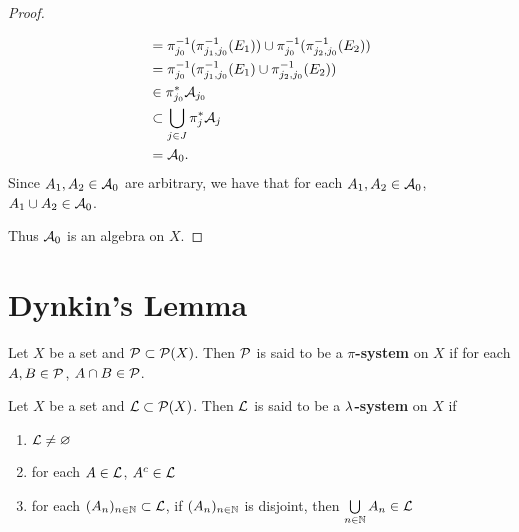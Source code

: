 \documentclass{book}
\begin{document}
\begin{proof}
\begin{enumerate}
\begin{align*}
			& = \pi_{j_0}^{-1}(\pi_{j_1, j_0}^{-1}(E_1)) \cup \pi_{j_0}^{-1}(\pi_{j_2, j_0}^{-1}(E_2)) \\
			& = \pi_{j_0}^{-1}(\pi_{j_1, j_0}^{-1}(E_1) \cup \pi_{j_2, j_0}^{-1}(E_2)) \\
			& \in \pi_{j_0}^*\mathcal{A}_{j_0} \\
			& \subset \bigcup\limits_{j \in J} \pi_j^*\mathcal{A}_j \\
			& = \mathcal{A}_0.
		\end{align*}
		Since $A_1, A_2 \in \mathcal{A}_0$ are arbitrary, we have that for each $A_1, A_2 \in \mathcal{A}_0$, $A_1 \cup A_2 \in \mathcal{A}_0$.
	\end{enumerate}
	Thus $\mathcal{A}_0$ is an algebra on $X$.
\end{proof}














	
	
	
	
	
	
	
	
	
	
	
	
	
	
	
	
	
	
	
	
	
	
	\newpage
	\section{Dynkin's Lemma}
	
	\begin{defn} 
		Let $X$ be a set and $\mathcal{P} \subset \mathcal{P}(X)$. Then $\mathcal{P}$ is said to be a \textbf{$\pi$-system} on $X$ if for each $A,B \in \mathcal{P}$, $A \cap B \in \mathcal{P}$.
	\end{defn}
	
	\begin{defn} 
		Let $X$ be a set and $\mathcal{L} \subset \mathcal{P}(X)$. Then $\mathcal{L}$ is said to be a \textbf{$\lambda$-system} on $X$ if 
		\begin{enumerate}
			\item $\mathcal{L} \neq \varnothing$
			\item for each $A \in \mathcal{L}$, $A^c \in \mathcal{L}$
			\item for each $(A_n)_{n \in \mathbb{N}} \subset \mathcal{L}$, if $(A_n)_{n \in \mathbb{N}}$ is disjoint, then $\bigcup\limits_{n \in \mathbb{N}}A_n \in \mathcal{L}$
		\end{enumerate}
	\end{defn}
	
\end{document}
